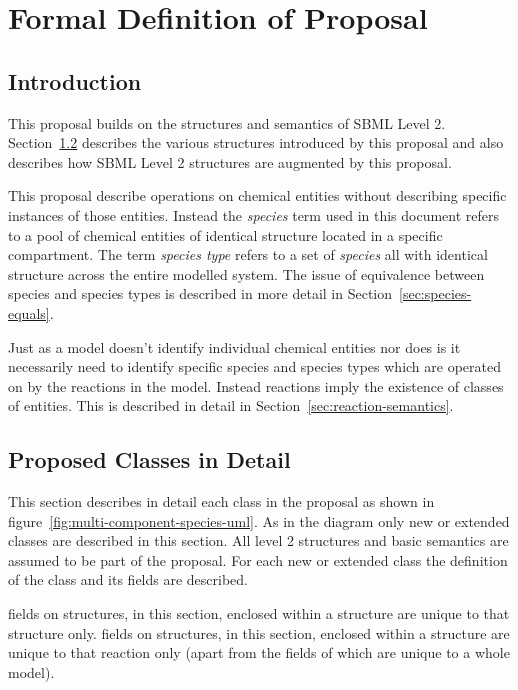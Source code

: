 \documentclass{cekarticle}
\begin{document}
\clearpage

\section{Formal Definition of Proposal}
\label{sec:definitions}

\subsection{Introduction}

This proposal builds on the structures and semantics of SBML Level
2.  Section~\ref{sec:class-in-detail} describes the various
structures introduced by this proposal and also describes how SBML
Level 2 structures are augmented by this proposal.

This proposal describe operations on chemical entities without
describing specific instances of those entities.  Instead the
\emph{species} term used in this document refers to a pool of
chemical entities of identical structure located in a specific
compartment.  The term \emph{species type} refers to a set of
\emph{species} all with identical structure across the entire
modelled system.  The issue of equivalence between species and
species types is described in more detail in
Section~\ref{sec:species-equals}.

Just as a model doesn't identify individual chemical entities nor
does is it necessarily need to identify specific species and
species types which are operated on by the reactions in the model.
Instead reactions imply the existence of classes of entities. This
is described in detail in Section~\ref{sec:reaction-semantics}.

\subsection{Proposed Classes in Detail}
\label{sec:class-in-detail}
This section describes in detail each
class in the proposal as shown in
figure~\ref{fig:multi-component-species-uml}. As in the diagram
only new or extended classes are described in this section. All
level 2 structures and basic semantics are assumed to be part of
the proposal. For each new or extended class the definition of the
class and its fields are described.

 fields on structures, in this section, enclosed within
a  structure are unique to that structure only.
 fields on structures, in this section, enclosed within
a  structure are unique to that reaction only
(apart from the  fields of
 which are unique to a whole
model).
\end{document}

